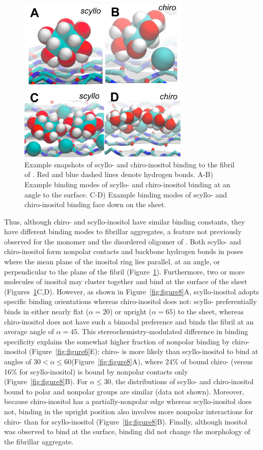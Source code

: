 \begin{figure}[htbp]
  \centering
  \includegraphics[width=3.2in]{figures/results1/GA4_paper_figures_submitted-7}
  \caption[Binding of scyllo- and chiro-inositol to the fibrillar aggregate of \gafour.]{Example snapshots of scyllo- and chiro-inositol binding to the fibril of \gafour. Red and blue dashed lines denote hydrogen bonds. A-B) Example binding modes of scyllo- and chiro-inositol binding at an angle to the surface. C-D) Example binding modes of scyllo- and chiro-inositol binding face down on the sheet.}
   \label{fig:figure7}
\end{figure}

Thus, although chiro- and scyllo-inositol have similar binding constants, they have different binding modes to fibrillar aggregates, a feature not previously observed for the monomer and the disordered oligomer of \gafour. Both scyllo- and chiro-inositol form nonpolar contacts and backbone hydrogen bonds in poses where the mean plane of the inositol ring lies parallel, at an angle, or perpendicular to the plane of the fibril (Figure~\ref{fig:figure7}). Furthermore, two or more molecules of inositol may cluster together and bind at the surface of the sheet (Figures~\ref{fig:figure7}C,D). However, as shown in Figure~\ref{fig:figure8}A, scyllo-inositol adopts specific binding orientations whereas chiro-inositol does not: scyllo- preferentially binds in either nearly flat ($\alpha = 20$\mathdeg) or upright ($\alpha = 65$\mathdeg) to the sheet, whereas chiro-inositol does not have such a bimodal preference and binds the fibril at an average angle of $\alpha = 45$\mathdeg. This stereochemistry-modulated difference in binding specificity explains the somewhat higher fraction of nonpolar binding by chiro-inositol (Figure~\ref{fig:figure6}E): chiro- is more likely than scyllo-inositol to bind at angles of $30$\mathdeg $< \alpha \leq 60$\mathdeg (Figure~\ref{fig:figure8}A), where 24\% of bound chiro- (versus 16\% for scyllo-inositol) is bound by nonpolar contacts only (Figure~\ref{fig:figure8}B). For $\alpha \leq 30$\mathdeg, the distributions of scyllo- and chiro-inositol bound to polar and nonpolar groups are similar (data not shown). Moreover, because chiro-inositol has a partially-nonpolar edge whereas scyllo-inositol does not, binding in the upright position also involves more nonpolar interactions for chiro- than for scyllo-inositol (Figure~\ref{fig:figure8}B). Finally, although inositol was observed to bind at the surface, binding did not change the morphology of the fibrillar aggregate.

